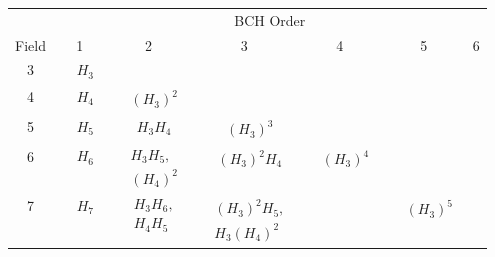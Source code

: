 \begin{table}[H]
  \centering
  \footnotesize
  \def\arraystretch{1.7}
  \begin{tabular}{ccccccc}
  \multicolumn{1}{c}{} & \multicolumn{6}{c}{BCH Order} \\
  Field & 1 & 2 & 3 & 4 & 5 & 6 \\
  \midrule
  3 & $\begin{aligned}&H_{3}\end{aligned}$ &  &  &  &  &  \\
  \hline
  4 & $\begin{aligned}&H_{4}\end{aligned}$ & $\begin{aligned}&(H_{3})^2\end{aligned}$ &  &  &  &  \\
  \hline
  5 & $\begin{aligned}&H_{5}\end{aligned}$ & $\begin{aligned}&H_{3}H_{4}\end{aligned}$ & $\begin{aligned}&(H_{3})^3\end{aligned}$ &  &  &  \\
  \hline
  6 & $\begin{aligned}&H_{6}\end{aligned}$ & $\begin{aligned}&H_{3}H_{5},\\&(H_{4})^2\end{aligned}$ & $\begin{aligned}&(H_{3})^2H_{4}\end{aligned}$ & $\begin{aligned}&(H_{3})^4\end{aligned}$ &  &  \\
  \hline
  7 & $\begin{aligned}&H_{7}\end{aligned}$ & $\begin{aligned}&H_{3}H_{6},\\&H_{4}H_{5}\end{aligned}$ & $\begin{aligned}&(H_{3})^2H_{5},\\&H_{3}(H_{4})^2\end{aligned}$ &  & $\begin{aligned}&(H_{3})^5\end{aligned}$ &  \\
  \hline

\end{tabular}
\end{table}
